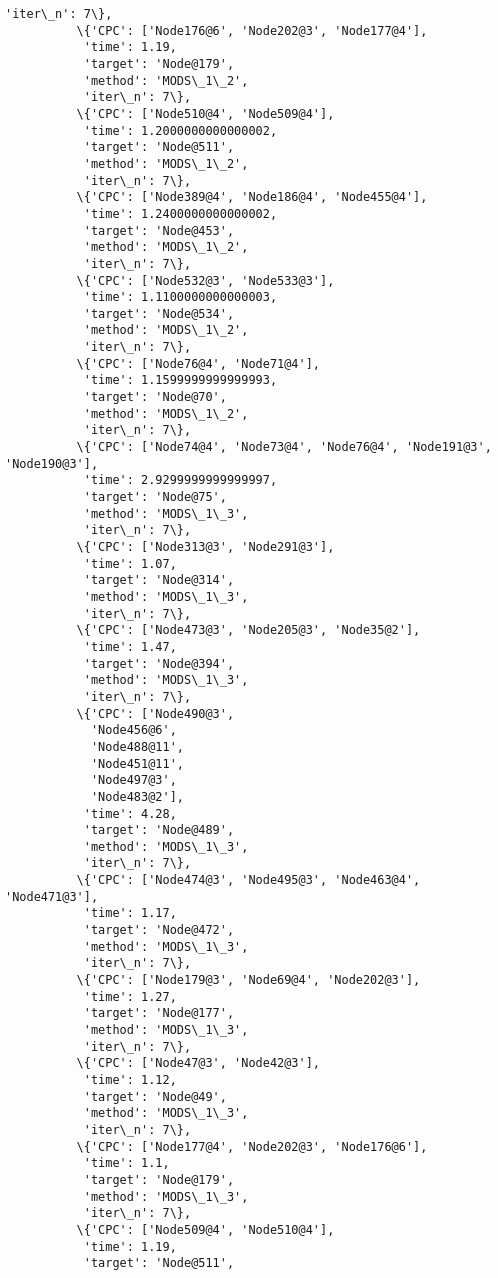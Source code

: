 \documentclass[11pt]{article}
\begin{document}
\begin{Verbatim}[commandchars=\\\{\}]
           'iter\_n': 7\},
          \{'CPC': ['Node176@6', 'Node202@3', 'Node177@4'],
           'time': 1.19,
           'target': 'Node@179',
           'method': 'MODS\_1\_2',
           'iter\_n': 7\},
          \{'CPC': ['Node510@4', 'Node509@4'],
           'time': 1.2000000000000002,
           'target': 'Node@511',
           'method': 'MODS\_1\_2',
           'iter\_n': 7\},
          \{'CPC': ['Node389@4', 'Node186@4', 'Node455@4'],
           'time': 1.2400000000000002,
           'target': 'Node@453',
           'method': 'MODS\_1\_2',
           'iter\_n': 7\},
          \{'CPC': ['Node532@3', 'Node533@3'],
           'time': 1.1100000000000003,
           'target': 'Node@534',
           'method': 'MODS\_1\_2',
           'iter\_n': 7\},
          \{'CPC': ['Node76@4', 'Node71@4'],
           'time': 1.1599999999999993,
           'target': 'Node@70',
           'method': 'MODS\_1\_2',
           'iter\_n': 7\},
          \{'CPC': ['Node74@4', 'Node73@4', 'Node76@4', 'Node191@3', 'Node190@3'],
           'time': 2.9299999999999997,
           'target': 'Node@75',
           'method': 'MODS\_1\_3',
           'iter\_n': 7\},
          \{'CPC': ['Node313@3', 'Node291@3'],
           'time': 1.07,
           'target': 'Node@314',
           'method': 'MODS\_1\_3',
           'iter\_n': 7\},
          \{'CPC': ['Node473@3', 'Node205@3', 'Node35@2'],
           'time': 1.47,
           'target': 'Node@394',
           'method': 'MODS\_1\_3',
           'iter\_n': 7\},
          \{'CPC': ['Node490@3',
            'Node456@6',
            'Node488@11',
            'Node451@11',
            'Node497@3',
            'Node483@2'],
           'time': 4.28,
           'target': 'Node@489',
           'method': 'MODS\_1\_3',
           'iter\_n': 7\},
          \{'CPC': ['Node474@3', 'Node495@3', 'Node463@4', 'Node471@3'],
           'time': 1.17,
           'target': 'Node@472',
           'method': 'MODS\_1\_3',
           'iter\_n': 7\},
          \{'CPC': ['Node179@3', 'Node69@4', 'Node202@3'],
           'time': 1.27,
           'target': 'Node@177',
           'method': 'MODS\_1\_3',
           'iter\_n': 7\},
          \{'CPC': ['Node47@3', 'Node42@3'],
           'time': 1.12,
           'target': 'Node@49',
           'method': 'MODS\_1\_3',
           'iter\_n': 7\},
          \{'CPC': ['Node177@4', 'Node202@3', 'Node176@6'],
           'time': 1.1,
           'target': 'Node@179',
           'method': 'MODS\_1\_3',
           'iter\_n': 7\},
          \{'CPC': ['Node509@4', 'Node510@4'],
           'time': 1.19,
           'target': 'Node@511',

\end{Verbatim}
\end{document}
